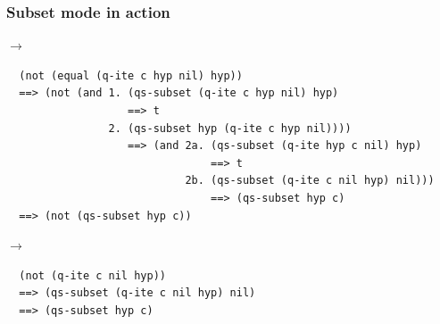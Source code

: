 \begin{frame}[fragile]
\frametitle{Subset mode in action}

 $\rightarrow$ 
{\footnotesize \begin{verbatim}
  (not (equal (q-ite c hyp nil) hyp))
  ==> (not (and 1. (qs-subset (q-ite c hyp nil) hyp)
                   ==> t
                2. (qs-subset hyp (q-ite c hyp nil))))
                   ==> (and 2a. (qs-subset (q-ite hyp c nil) hyp)
                                ==> t
                            2b. (qs-subset (q-ite c nil hyp) nil)))
                                ==> (qs-subset hyp c)
  ==> (not (qs-subset hyp c))
\end{verbatim}}


\SmallSkip
{} $\rightarrow$ 
{\footnotesize \begin{verbatim}
  (not (q-ite c nil hyp))
  ==> (qs-subset (q-ite c nil hyp) nil)
  ==> (qs-subset hyp c)
\end{verbatim}}

\end{frame}


